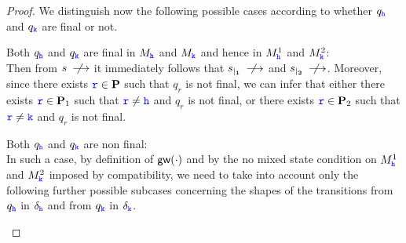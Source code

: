 \begin{proof}
% 

\noindent
 We distinguish now the following possible cases according to whether $q_\HH$ and $q_\KK$ are final or not.
 \begin{description}
\item Both $q_\HH$ and $q_\KK$ are final in $M_\HH$ and $M_\KK$ and hence in $M^1_\HH$ and $M^2_\KK$: \\
Then from $s\notlts{}$ it immediately follows that $\restrict{s}{1}\notlts{}$ and $\restrict{s}{2}\notlts{}$. Moreover, since there exists $\ttr\in\roles$ such that $q_r$ is not final,
 we can infer that either there exists $\ttr\in\roles_1$
 such that $\ttr\neq\HH$ and $q_r$ is not final,
 or there exists $\ttr\in\roles_2$ such that $\ttr\neq\KK$ and $q_r$ is not final.
 \item Both $q_\HH$ and $q_\KK$ are non final: \\
In such a case, by definition of $\gateway{\cdot}$ and by the no mixed state condition on $M^1_\HH$ and $M^2_\KK$
imposed by compatibility,  we need  to 
take into account only the following  further possible subcases concerning the shapes of the transitions from  $q_\HH$  in $\delta_\HH$ and from  $q_\KK$ in $\delta_\KK$.


\end{description}
\end{proof}
